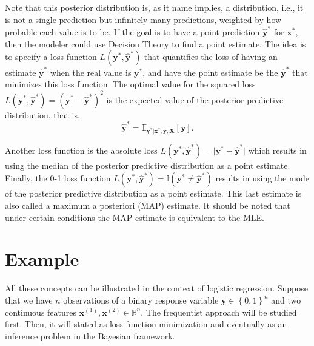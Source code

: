 Note that this posterior distribution is, as it name implies, a distribution, i.e., it is not a single prediction but infinitely many predictions, weighted by how probable each value is to be.
If the goal is to have a point prediction $\hat{\boldsymbol{y}}^*$ for $\boldsymbol{x}^*$, then the modeler could use Decision Theory to find a point estimate. The idea is to specify a loss function $L(\boldsymbol{y}^*, \hat{\boldsymbol{y}}^*)$ that quantifies the loss of having an estimate $\hat{\boldsymbol{y}}^*$ when the real value is $\boldsymbol{y}^*$, and have the point estimate be the $\hat{\boldsymbol{y}}^*$ that minimizes this loss function.
The optimal value for the squared loss $L(\boldsymbol{y}^*, \hat{\boldsymbol{y}}^*) = (\boldsymbol{y}^* - \hat{\boldsymbol{y}}^*)^2$ is the expected value of the posterior predictive distribution, that is,
\begin{equation}
  \hat{\boldsymbol{y}}^* = \mathbb{E}_{\boldsymbol{y}^* | \boldsymbol{x}^*, \boldsymbol{y}, \boldsymbol{X}} \left[ \boldsymbol{y} \right].
\end{equation}

Another loss function is the absolute loss $L(\boldsymbol{y}^*, \hat{\boldsymbol{y}}^*) = \vert \boldsymbol{y}^* - \hat{\boldsymbol{y}}^* \vert$ which results in using the median of the posterior predictive distribution as a point estimate. Finally, the 0-1 loss function $L(\boldsymbol{y}^*, \hat{\boldsymbol{y}}^*) = \mathbb{I}(\boldsymbol{y}^* \neq \hat{\boldsymbol{y}}^* )$ results in using the mode of the posterior predictive distribution as a point estimate. This last estimate is also called a maximum a posteriori (MAP) estimate. It should be noted that under certain conditions the MAP estimate is equivalent to the MLE.

\section{Example}

All these concepts can be illustrated in the context of logistic regression. Suppose that we have $n$ observations of a binary response variable $\boldsymbol{y} \in \left\{0, 1\right\}^n$ and two continuous features $\boldsymbol{x}^{(1)}, \boldsymbol{x}^{(2)} \in \mathbb{R}^n$. The frequentist approach will be studied first.
Then, it will stated as loss function minimization and eventually as an inference problem in the Bayesian framework.

